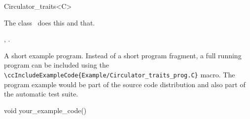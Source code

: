 

\begin{ccRefClass}{Circulator_traits<C>}  %


\ccDefinition
  
The class \ccRefName\ does this and that.


\ccIsModel


\ccTypes


\ccCreation
{}  %


\clearpage
\ccOperations


\ccSeeAlso

,
.

\ccExample

A short example program.
Instead of a short program fragment, a full running program can be
included using the 
\verb|\ccIncludeExampleCode{Example/Circulator_traits_prog.C}| 
macro. The program example would be part of the source code distribution and
also part of the automatic test suite.

\begin{ccExampleCode}
void your_example_code() {
}
\end{ccExampleCode}


\end{ccRefClass}


